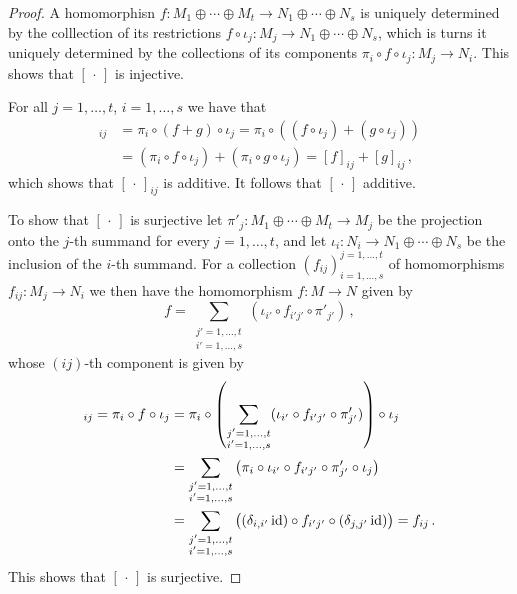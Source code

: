 \begin{proof}
  A homomorphisn $f \colon M_1 \oplus \dotsb \oplus M_t \to N_1 \oplus \dotsb \oplus N_s$ is uniquely determined by the colllection of its restrictions $f \circ \iota_j \colon M_j \to N_1 \oplus \dotsb \oplus N_s$, which is turns it uniquely determined by the collections of its components $\pi_i \circ f \circ \iota_j \colon M_j \to N_i$.
  This shows that $[\,\cdot\,]$ is injective.
  
  For all $j = 1, \dotsc, t$, $i = 1, \dotsc, s$ we have that
  \begin{align*}
        [f+g]_{ij}
    &=  \pi_i \circ (f+g) \circ \iota_j
     =  \pi_i \circ ((f \circ \iota_j) + (g \circ \iota_j)) \\
    &=  (\pi_i \circ f \circ \iota_j) + (\pi_i \circ g \circ \iota_j)
     =  [f]_{ij} + [g]_{ij} \,,
  \end{align*}
  which shows that $[\,\cdot\,]_{ij}$ is additive.
  It follows that $[\,\cdot\,]$ additive.
  
  To show that $[\,\cdot\,]$ is surjective let $\pi'_j \colon M_1 \oplus \dotsb \oplus M_t \to M_j$ be the projection onto the $j$-th summand for every $j = 1, \dotsc, t$, and let $\iota_i \colon N_i \to N_1 \oplus \dotsb \oplus N_s$ be the inclusion of the $i$-th summand.
  For a collection $(f_{ij})^{j = 1, \dotsc, t}_{i = 1, \dotsc, s}$ of homomorphisms $f_{ij} \colon M_j \to N_i$ we then have the homomorphism $f \colon M \to N$ given by
  \[
      f
    = \sum_{\substack{j' = 1, \dotsc, t \\ i' = 1, \dotsc, s}} (\iota_{i'} \circ f_{i'j'} \circ \pi'_{j'}) \,,
  \]
  whose $(ij)$-th component is given by
  \begin{align*}
        [f]_{ij}
     =  \pi_i \circ f \circ \iota_j
    &=  \pi_i
        \circ
        \left(
          \sum_{\substack{j' = 1, \dotsc, t \\ i' = 1, \dotsc, s}} (\iota_{i'} \circ f_{i'j'} \circ \pi'_{j'})
        \right)
        \circ
        \iota_j \\
    &=  \sum_{\substack{j' = 1, \dotsc, t \\ i' = 1, \dotsc, s}}
        \big(
        \pi_i \circ \iota_{i'} \circ f_{i'j'} \circ \pi'_{j'} \circ \iota_j
        \big) \\
    &=  \sum_{\substack{j' = 1, \dotsc, t \\ i' = 1, \dotsc, s}}
        \big(
        (\delta_{i,i'} \id) \circ f_{i'j'} \circ (\delta_{j,j'} \id)
        \big)
     =  f_{ij} \,.
  \end{align*}
  This shows that $[\,\cdot\,]$ is surjective.
\end{proof}


